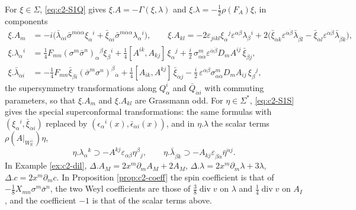 \begin{remark}
For $\xi\in\Sigma$, \eqref{eq:c2-S1Q} gives $\xi.A=-\Gamma(\xi,\lambda)$ and $\xi.\lambda=-\tfrac12\rho(F_A)\xi$, in components
\[
\begin{aligned}
\xi.A_m&=-i\big(\bar\lambda_{\dot\alpha i}\bar\sigma^{m\dot\alpha\alpha}\xi_\alpha{}^i+\bar\xi_{\dot\alpha i}\bar\sigma^{m\dot\alpha\alpha}\lambda_\alpha{}^i\big),\qquad
\xi.A_{kl}=-2\varepsilon_{jikl}\xi_\alpha{}^j\varepsilon^{\alpha\beta}\lambda_\beta{}^i+2\big(\bar\xi_{\dot\alpha k}\varepsilon^{\dot\alpha\dot\beta}\bar\lambda_{\dot\beta l}-\bar\xi_{\dot\alpha l}\varepsilon^{\dot\alpha\dot\beta}\bar\lambda_{\dot\beta k}\big),\\
\xi.\lambda_\alpha{}^i&=\tfrac14F_{mn}(\sigma^m\bar\sigma^n)_\alpha{}^\beta\xi_\beta{}^i+\tfrac14[A^{ik},A_{kj}]\,\xi_\alpha{}^j+\tfrac i2\,\sigma^m_{\alpha\dot\alpha}\varepsilon^{\dot\alpha\dot\beta}D_mA^{ij}\,\bar\xi_{\dot\beta j},\\
\xi.\bar\lambda_{\dot\alpha i}&=-\tfrac14F_{mn}\bar\xi_{\dot\beta i}(\bar\sigma^m\sigma^n)^{\dot\beta}{}_{\dot\alpha}+\tfrac14[A_{ik},A^{kj}]\,\bar\xi_{\dot\alpha j}-\tfrac i2\,\varepsilon^{\alpha\beta}\sigma^m_{\alpha\dot\alpha}D_mA_{ij}\,\xi_\beta{}^j ,
\end{aligned}
\]
the supersymmetry transformations along $Q^i_\alpha$ and $\bar Q_{\dot\alpha i}$ with commuting parameters, so that $\xi.A_m$ and $\xi.A_{kl}$ are Grassmann odd. For $\eta\in\Sigma^*$, \eqref{eq:c2-S1S} gives the special superconformal transformations: the same formulas with $(\xi_\alpha{}^i,\bar\xi_{\dot\alpha i})$ replaced by $(\epsilon_\alpha{}^i(x),\bar\epsilon_{\dot\alpha i}(x))$, and in $\eta.\lambda$ the scalar terms $\rho(A|_{W_{\mathbb R}^\perp})\eta$,
\[
\eta.\lambda_\alpha{}^k\supset-A^{kj}\varepsilon_{\alpha\beta}\eta^\beta{}_j,\qquad \eta.\bar\lambda_{\dot\beta k}\supset-A_{kj}\varepsilon_{\dot\beta\dot\alpha}\bar\eta^{\dot\alpha j}.
\]
In Example \ref{ex:c2-dil}, $\Delta.A_M=2x^m\partial_mA_M+2A_M$, $\Delta.\lambda=2x^m\partial_m\lambda+3\lambda$, $\Delta.c=2x^m\partial_mc$. In Proposition \ref{prop:c2-coeff} the spin coefficient is that of $-\tfrac18X_{mn}\sigma^m\bar\sigma^n$, the two Weyl coefficients are those of $\tfrac38\operatorname{div}v$ on $\lambda$ and $\tfrac14\operatorname{div}v$ on $A_I$, and the coefficient $-1$ is that of the scalar terms above.
\end{remark}

